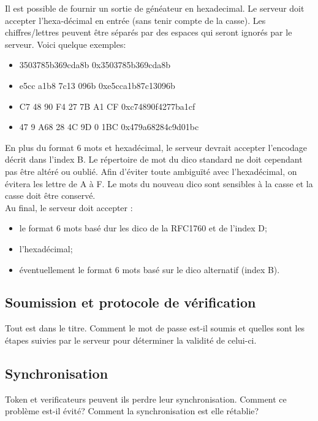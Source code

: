\documentclass{../res/univ-projet}
\begin{document}
        Il est possible de fournir un sortie de généateur en hexadecimal. Le 
serveur doit accepter l'hexa-décimal en entrée (sans tenir compte de la casse). 
Les chiffres/lettres peuvent être séparés par des espaces qui seront ignorés par 
le serveur. Voici quelque exemples:
        \begin{itemize}
            \item 3503785b369cda8b              0x3503785b369cda8b
            \item e5cc a1b8 7c13 096b           0xe5cca1b87c13096b
            \item C7 48 90 F4 27 7B A1 CF       0xc74890f4277ba1cf
            \item 47 9 A68 28 4C 9D 0 1BC       0x479a68284c9d01bc
        \end{itemize}

        En plus du format 6 mots et hexadécimal, le serveur devrait accepter 
l'encodage décrit dans l'index B. Le répertoire de mot du dico standard ne doit 
cependant pas \^etre altéré ou oubli\'e. Afin d'\'eviter toute ambiguïté avec 
l'hexadécimal, on \'evitera les lettre de A à F. Le mots du nouveau dico sont 
sensibles à la casse et la casse doit être conservé.\\

        Au final, le serveur doit accepter :
        \begin{itemize}
            \item le format 6 mots basé dur les dico de la RFC1760 et de l'index 
D;
            \item l'hexadécimal;
            \item éventuellement le format 6 mots basé sur le dico alternatif 
(index B).
        \end{itemize}
  
  \subsection{Soumission et protocole de vérification}
    Tout est dans le titre. Comment le mot de passe est-il soumis et quelles 
sont les étapes suivies par le serveur pour déterminer la validité de celui-ci.
  
  \subsection{Synchronisation}
    Token et verificateurs peuvent ils perdre leur synchronisation. Comment ce 
problème est-il évité? Comment la synchronisation est elle rétablie?
  
\end{document}
